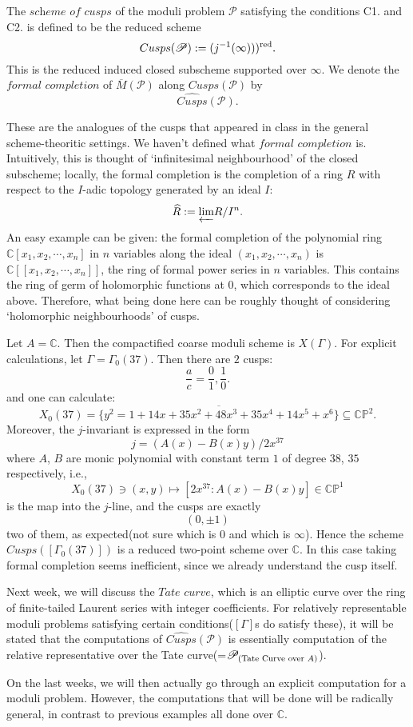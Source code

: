 \documentclass[a4paper,11pt]{article}
\begin{document}
\begin{defn}
The $\textit{scheme of cusps}$ of the moduli problem $\mathcal{P}$ satisfying the conditions C1. and C2. is defined to be the reduced scheme
\[
Cusps(\mathcal{P}) := (j^{-1}(\infty)))^{\textnormal{red}}.
\]
This is the reduced induced closed subscheme supported over $\infty$.
We denote the $\textit{formal completion}$ of $\overline{M}(\mathcal{P})$ along $Cusps(\mathcal{P})$ by
\[
\widehat{Cusps}(\mathcal{P}).
\]
\end{defn}

These are the analogues of the cusps that appeared in class in the general scheme-theoritic settings.
We haven't defined what $\textit{formal completion}$ is.
Intuitively, this is thought of `infinitesimal neighbourhood' of the closed subscheme; locally, the formal completion is the completion of a ring $R$ with respect to the $I$-adic topology generated by an ideal $I$:
\[
\widehat{R}:=\underleftarrow{ \vspace{0.4ex} \textnormal{lim}}R/I^n.
\]
An easy example can be given: the formal completion of the polynomial ring $\mathbb{C}[x_1,x_2,\cdots,x_n]$ in $n$ variables along the ideal $(x_1,x_2,\cdots,x_n)$ is $\mathbb{C}[[x_1,x_2,\cdots,x_n]]$, the ring of formal power series in $n$ variables.
This contains the ring of germ of holomorphic functions at $0$, which corresponds to the ideal above.
Therefore, what being done here can be roughly thought of considering `holomorphic neighbourhoods' of cusps.

\begin{exm}
Let $A=\mathbb{C}$.
Then the compactified coarse moduli scheme is $X(\Gamma)$.
For explicit calculations, let $\Gamma=\Gamma_0(37)$.
Then there are $2$ cusps:
\[
\frac{a}{c}=\frac{0}{1},\frac{1}{0}.
\]
and one can calculate:
\[
X_0(37)=\overline{\{ y^2=1+14x+35x^2+48x^3+35x^4+14x^5+x^6\}} \subseteq \mathbb{CP}^2.
\]
Moreover, the $j$-invariant is expressed in the form
\[
j=(A(x)-B(x)y)/2x^{37}
\]
where $A$, $B$ are monic polynomial with constant term $1$ of degree $38$, $35$ respectively, i.e.,
\[
X_0(37) \ni (x,y) \mapsto [2x^37:A(x)-B(x)y] \in \mathbb{CP}^1
\]
is the map into the $j$-line, and the cusps are exactly
\[
(0,\pm1)
\]
two of them, as expected(not sure which is $0$ and which is $\infty$).
Hence the scheme $Cusps([\Gamma_0(37)])$ is a reduced two-point scheme over $\mathbb{C}$.
In this case taking formal completion seems inefficient, since we already understand the cusp itself.
\end{exm}


Next week, we will discuss the $\textit{Tate curve}$, which is an elliptic curve over the ring of finite-tailed Laurent series with integer coefficients.
For relatively representable moduli problems satisfying certain conditions($[\Gamma]$s do satisfy these), it will be stated that the computations of $\widehat{Cusps}(\mathcal{P})$ is essentially computation of the relative representative over the Tate curve(=$\mathcal{P}_{(\textnormal{Tate Curve over }A)}$).

On the last weeks, we will then actually go through an explicit computation for a moduli problem.
However, the computations that will be done will be radically general, in contrast to previous examples all done over $\mathbb{C}$.
\end{document}
